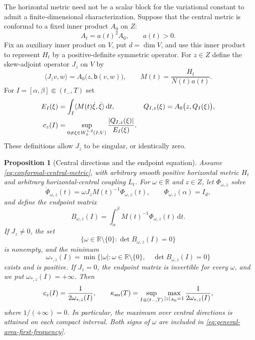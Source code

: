 \documentclass[10pt,a4paper]{article}
\numberwithin{equation}{section}
\newtheorem{proposition}[theorem]{Proposition}
\theoremstyle{definition}
\theoremstyle{remark}
\newcommand{\R}{\mathbb R}
\newcommand{\dd}{\mathrm d}
\begin{document}
The horizontal metric need not be a scalar block for the variational
constant to admit a finite-dimensional characterization.  Suppose that
the central metric is conformal to a fixed inner product $A_0$ on $Z$:
\begin{equation}
 A_t=a(t)^2A_0,\qquad a(t)>0.
 \label{eq:conformal-central-metric}
\end{equation}
Fix an auxiliary inner product on $V$, put $d=\dim V$, and use this
inner product to represent $H_t$ by a positive-definite symmetric
operator.  For $z\in Z$ define the skew-adjoint operator $J_z$ on $V$ by
\begin{equation}
 \langle J_zv,w\rangle=A_0\bigl(z,\mathsf b(v,w)\bigr),
 \qquad M(t)=\frac{H_t}{N(t)a(t)}.
 \label{eq:central-direction-operator}
\end{equation}
For $I=[\alpha,\beta]\Subset(t_-,T)$ set
\begin{align}
 E_I(\xi)&=\int_I\langle M(t)\dot\xi,\dot\xi\rangle\,\dd t,
 & Q_{I,z}(\xi)&=A_0\bigl(z,Q_I(\xi)\bigr),\notag\\
 c_z(I)&=\sup_{0\ne\xi\in W^{1,2}_0(I;V)}
                  \frac{|Q_{I,z}(\xi)|}{E_I(\xi)}.
 \label{eq:directional-area-constant}
\end{align}
These definitions allow $J_z$ to be singular, or identically zero.

\begin{proposition}[Central directions and the endpoint equation]
\label{prop:central-endpoint-spectrum}
Assume \eqref{eq:conformal-central-metric}, with arbitrary smooth positive
horizontal metric $H_t$ and arbitrary horizontal-central coupling $L_t$.
For $\omega\in\R$ and $z\in Z$, let $\Phi_{\omega,z}$ solve
\begin{equation}
 \dot\Phi_{\omega,z}(t)
   =\omega J_zM(t)^{-1}\Phi_{\omega,z}(t),
 \qquad \Phi_{\omega,z}(\alpha)=I_d,
 \label{eq:general-area-momentum}
\end{equation}
and define the endpoint matrix
\begin{equation}
 B_{\omega,z}(I)
   =\int_\alpha^\beta M(t)^{-1}\Phi_{\omega,z}(t)\,\dd t.
 \label{eq:general-area-endpoint}
\end{equation}
If $J_z\ne0$, the set
\[
 \{\omega\in\R\setminus\{0\}:\det B_{\omega,z}(I)=0\}
\]
is nonempty, and the minimum
\begin{equation}
 \omega_{*,z}(I)
 =\min\{|\omega|:\omega\in\R\setminus\{0\},\quad
                  \det B_{\omega,z}(I)=0\}
 \label{eq:general-area-first-frequency}
\end{equation}
exists and is positive.  If $J_z=0$, the endpoint matrix is invertible
for every $\omega$, and we put $\omega_{*,z}(I)=+\infty$.
Then
\begin{equation}
 c_z(I)=\frac1{2\omega_{*,z}(I)},\qquad
 \kappa_{\rm an}(T)
  =\sup_{I\Subset(t_-,T)}\max_{|z|_{A_0}=1}
                         \frac1{2\omega_{*,z}(I)},
 \label{eq:general-area-exact-spectrum}
\end{equation}
where $1/(+\infty)=0$.  In particular, the maximum over central
directions is attained on each compact interval.  Both signs of $\omega$
are included in \eqref{eq:general-area-first-frequency}.
\end{proposition}
\end{document}
